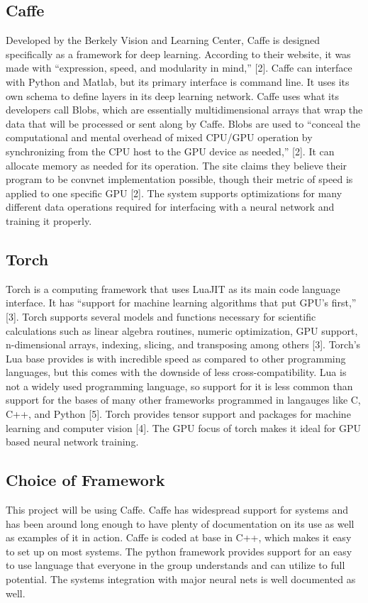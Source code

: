 \documentclass{scrreprt}
\begin{document}
\subsection{Caffe}
Developed by the Berkely Vision and Learning Center, Caffe is designed specifically as a
framework for deep learning. According to their website, it was made with “expression, speed,
and modularity in mind,” [2]. Caffe can interface with Python and Matlab, but its primary
interface is command line. It uses its own schema to define layers in its deep learning network.
Caffe uses what its developers call Blobs, which are essentially multidimensional arrays that
wrap the data that will be processed or sent along by Caffe. Blobs are used to “conceal the
computational and mental overhead of mixed CPU/GPU operation by synchronizing from the
CPU host to the GPU device as needed,” [2]. It can allocate memory as needed for its operation.
The site claims they believe their program to be convnet implementation possible, though their
metric of speed is applied to one specific GPU [2]. The system supports optimizations for many
different data operations required for interfacing with a neural network and training it properly.

\subsection{Torch}
Torch is a computing framework that uses LuaJIT as its main code language interface. It has
“support for machine learning algorithms that put GPU’s first,” [3]. Torch supports several
models and functions necessary for scientific calculations such as linear algebra routines,
numeric optimization, GPU support, n-dimensional arrays, indexing, slicing, and transposing
among others [3]. Torch’s Lua base provides is with incredible speed as compared to other
programming languages, but this comes with the downside of less cross-compatibility. Lua is not
a widely used programming language, so support for it is less common than support for the bases
of many other frameworks programmed in langauges like C, C++, and Python [5]. Torch
provides tensor support and packages for machine learning and computer vision [4]. The GPU
focus of torch makes it ideal for GPU based neural network training.

\subsection{Choice of Framework}

This project will be using Caffe. Caffe has widespread support for systems and has been around
long enough to have plenty of documentation on its use as well as examples of it in action. Caffe
is coded at base in C++, which makes it easy to set up on most systems. The python framework
provides support for an easy to use language that everyone in the group understands and can
utilize to full potential. The systems integration with major neural nets is well documented as
well.
\end{document}
